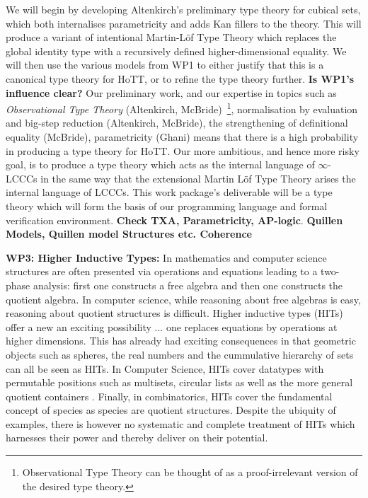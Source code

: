 \documentclass[a4paper,11pt]{article}
\begin{document}
We will begin by developing Altenkirch's preliminary type theory for
cubical sets, which both internalises parametricity and adds Kan
fillers to the theory. This will produce a variant of intentional
Martin-L\"of Type Theory which replaces the global identity type with
a recursively defined higher-dimensional equality. We will then use
the various models from WP1 to either justify that this is a canonical
type theory for HoTT, or to refine the type theory further. {\bf Is
  WP1's influence clear?} Our preliminary work, and our expertise in
topics such as {\em Observational Type Theory} (Altenkirch,
McBride)~\footnote{ Observational Type Theory can be thought of as a
  proof-irrelevant version of the desired type theory.},
normalisation by evaluation and big-step reduction (Altenkirch,
McBride), the strengthening of definitional equality (McBride),
parametricity (Ghani) means that there is a high probability in
producing a type theory for HoTT. Our more ambitious, and hence more
risky goal, is to produce a type theory which acts as the internal
language of $\infty$-LCCCs in the same way that the extensional Martin
L\"of Type Theory arises the internal language of LCCCs.  This
work package's deliverable will be a type theory which will form the
basis of our programming language and formal verification
environment. {\bf Check TXA, Parametricity, AP-logic}.  {\bf Quillen
  Models, Quillen model Structures etc. Coherence}


{\bf WP3: Higher Inductive Types:} In mathematics and computer science
structures are often presented via operations and equations leading to
a two-phase analysis: first one constructs a free algebra and then one
constructs the quotient algebra. In computer science, while reasoning
about free algebras is easy, reasoning about quotient structures is
difficult. Higher inductive types (HITs) offer a new an exciting
possibility ... one replaces equations by operations at higher
dimensions. This has already had exciting consequences in that
geometric objects such as spheres, the real numbers and the
cummulative hierarchy of sets can all be seen as HITs.  In Computer
Science, HITs cover datatypes with permutable positions such as
multisets, circular lists as well as the more general quotient
containers \cite{abottAltenGhaniMcB:quotientContainers, EPSRC
  Containers}. Finally, in combinatorics, HITs cover the fundamental
concept of species as species are quotient structures. Despite the
ubiquity of examples, there is however no systematic and complete
treatment of HITs which harnesses their power and thereby deliver on
their potential.
\end{document}
